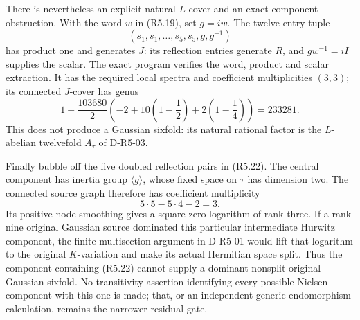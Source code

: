 There is nevertheless an explicit natural $L$-cover and an exact
component obstruction.  With the word $w$ in (R5.19), set $g=iw$.
The twelve-entry tuple
\[
             (s_1,s_1,\ldots,s_5,s_5,g,g^{-1})
                                                               \tag{R5.22}
\]
has product one and generates $J$: its reflection entries generate
$R$, and $gw^{-1}=iI$ supplies the scalar.  The exact program
verifies the word, product and scalar extraction.
It has the required local spectra and coefficient multiplicities
$(3,3)$; its connected $J$-cover has genus
\[
 1+\frac{103680}{2}
        \left(-2+10\left(1-\frac12\right)
                    +2\left(1-\frac14\right)\right)
                 =233281.
\]
This does not produce a Gaussian sixfold: its natural rational
factor is the $L$-abelian twelvefold $A_\tau$ of D-R5-03.

Finally bubble off the five doubled reflection pairs in (R5.22).
The central component has inertia group $\langle g\rangle$, whose
fixed space on $\tau$ has dimension two.  The connected source
graph therefore has coefficient multiplicity
\[
                      5\cdot5-5\cdot4-2=3.
                                                               \tag{R5.23}
\]
Its positive node smoothing gives a square-zero logarithm of rank
three.  If a rank-nine original Gaussian source dominated this
particular intermediate Hurwitz component, the finite-multisection
argument in D-R5-01 would lift that logarithm to the original
$K$-variation and make its actual Hermitian space split.
Thus the component containing (R5.22) cannot supply a dominant
nonsplit original Gaussian sixfold.  No transitivity assertion
identifying every possible Nielsen component with this one is
made; that, or an independent generic-endomorphism calculation,
remains the narrower residual gate.

